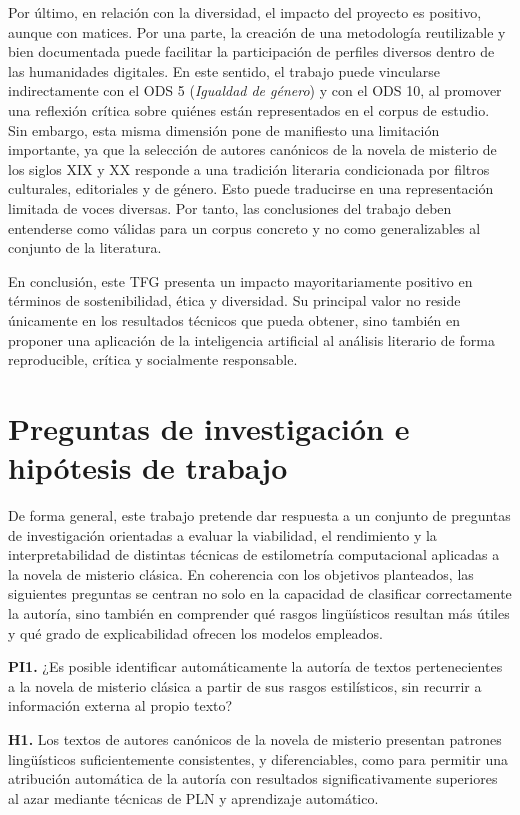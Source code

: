 \documentclass[IB]{TFUOC}%
\begin{document}
Por último, en relación con la diversidad, el impacto del proyecto es positivo, aunque con matices. Por una parte, la creación de una metodología reutilizable y bien documentada puede facilitar la participación de perfiles diversos dentro de las humanidades digitales. En este sentido, el trabajo puede vincularse indirectamente con el ODS 5 (\textit{Igualdad de género}) y con el ODS 10, al promover una reflexión crítica sobre quiénes están representados en el corpus de estudio. Sin embargo, esta misma dimensión pone de manifiesto una limitación importante, ya que la selección de autores canónicos de la novela de misterio de los siglos XIX y XX responde a una tradición literaria condicionada por filtros culturales, editoriales y de género. Esto puede traducirse en una representación limitada de voces diversas. Por tanto, las conclusiones del trabajo deben entenderse como válidas para un corpus concreto y no como generalizables al conjunto de la literatura.

En conclusión, este TFG presenta un impacto mayoritariamente positivo en términos de sostenibilidad, ética y diversidad. Su principal valor no reside únicamente en los resultados técnicos que pueda obtener, sino también en proponer una aplicación de la inteligencia artificial al análisis literario de forma reproducible, crítica y socialmente responsable.

\section{Preguntas de investigación e hipótesis de trabajo}

De forma general, este trabajo pretende dar respuesta a un conjunto de preguntas de investigación orientadas a evaluar la viabilidad, el rendimiento y la interpretabilidad de distintas técnicas de estilometría computacional aplicadas a la novela de misterio clásica. En coherencia con los objetivos planteados, las siguientes preguntas se centran no solo en la capacidad de clasificar correctamente la autoría, sino también en comprender qué rasgos lingüísticos resultan más útiles y qué grado de explicabilidad ofrecen los modelos empleados.

\textbf{PI1.} ¿Es posible identificar automáticamente la autoría de textos pertenecientes a la novela de misterio clásica a partir de sus rasgos estilísticos, sin recurrir a información externa al propio texto?

\textbf{H1.} Los textos de autores canónicos de la novela de misterio presentan patrones lingüísticos suficientemente consistentes, y diferenciables, como para permitir una atribución automática de la autoría con resultados significativamente superiores al azar mediante técnicas de PLN y aprendizaje automático.
\end{document}
